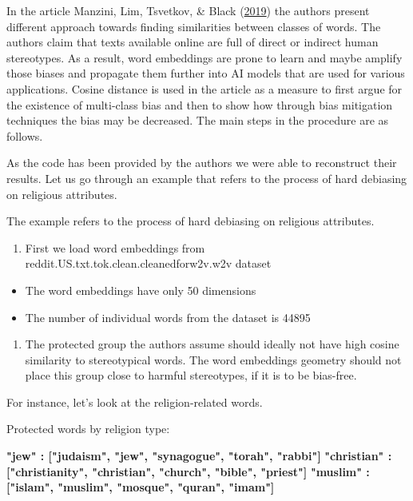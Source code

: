 \documentclass[12pt,]{book}
\providecommand{\tightlist}{%
  \setlength{\itemsep}{0pt}\setlength{\parskip}{0pt}}
\begin{document}
In the article Manzini, Lim, Tsvetkov, \& Black
(\protect\hyperlink{ref-manzini2019black}{2019}) the authors present
different approach towards finding similarities between classes of
words. The authors claim that texts available online are full of direct
or indirect human stereotypes. As a result, word embeddings are prone to
learn and maybe amplify those biases and propagate them further into AI
models that are used for various applications. Cosine distance is used
in the article as a measure to first argue for the existence of
multi-class bias and then to show how through bias mitigation techniques
the bias may be decreased. The main steps in the procedure are as
follows.

As the code has been provided by the authors we were able to reconstruct
their results. Let us go through an example that refers to the process
of hard debiasing on religious attributes.

The example refers to the process of hard debiasing on religious
attributes.

\begin{enumerate}
\def\labelenumi{\arabic{enumi}.}
\tightlist
\item
  First we load word embeddings from
  reddit.US.txt.tok.clean.cleanedforw2v.w2v dataset
\end{enumerate}

\begin{itemize}
\tightlist
\item
  The word embeddings have only 50 dimensions
\item
  The number of individual words from the dataset is 44895
\end{itemize}

\begin{enumerate}
\def\labelenumi{\arabic{enumi}.}
\setcounter{enumi}{1}
\tightlist
\item
  The protected group the authors assume should ideally not have high
  cosine similarity to stereotypical words. The word embeddings geometry
  should not place this group close to harmful stereotypes, if it is to
  be bias-free.
\end{enumerate}

For instance, let's look at the religion-related words.

Protected words by religion type:

\textbf{"jew"       : ["judaism", "jew", "synagogue", "torah", "rabbi"]}
\newline
\textbf{"christian" : ["christianity", "christian", "church", "bible", "priest"]}
\newline
\textbf{"muslim"    : ["islam", "muslim", "mosque", "quran", "imam"]}
\newline
\end{document}
